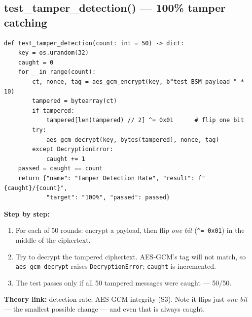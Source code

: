 \documentclass[11pt,a4paper]{report}
\begin{document}
\subsection{test\_tamper\_detection() --- 100\% tamper catching}
\begin{lstlisting}[style=py,caption={evaluate\_security.py --- the tamper detection test.}]
def test_tamper_detection(count: int = 50) -> dict:
    key = os.urandom(32)
    caught = 0
    for _ in range(count):
        ct, nonce, tag = aes_gcm_encrypt(key, b"test BSM payload " * 10)
        tampered = bytearray(ct)
        if tampered:
            tampered[len(tampered) // 2] ^= 0x01      # flip one bit
        try:
            aes_gcm_decrypt(key, bytes(tampered), nonce, tag)
        except DecryptionError:
            caught += 1
    passed = caught == count
    return {"name": "Tamper Detection Rate", "result": f"{caught}/{count}",
            "target": "100%", "passed": passed}
\end{lstlisting}
\textbf{Step by step:}
\begin{enumerate}
  \item For each of 50 rounds: encrypt a payload, then flip \emph{one bit}
        (\texttt{\^{}= 0x01}) in the middle of the ciphertext.
  \item Try to decrypt the tampered ciphertext. AES-GCM's tag will not match, so
        \texttt{aes\_gcm\_decrypt} raises \texttt{DecryptionError};
        \texttt{caught} is incremented.
  \item The test passes only if all 50 tampered messages were caught --- 50/50.
\end{enumerate}
\textbf{Theory link:} detection rate; AES-GCM integrity (S3). Note it flips just
\emph{one bit} --- the smallest possible change --- and even that is always
caught.
\end{document}
